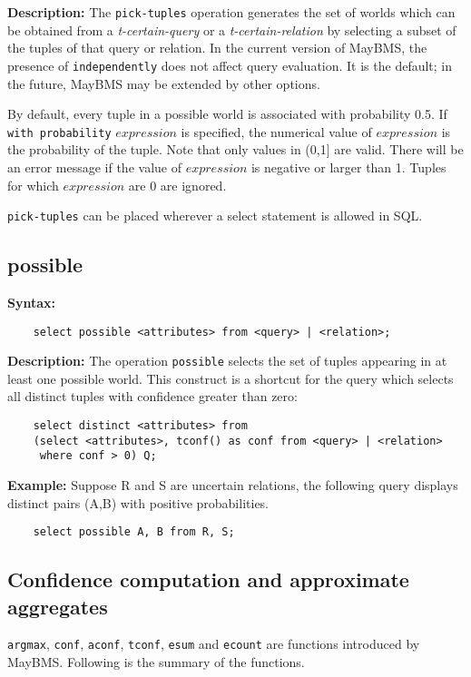 \noindent \textbf{Description:}
%
The {\tt pick-tuples} operation generates the set of worlds which can be obtained from a {\it t-certain-query} or a {\it t-certain-relation} by selecting a subset of the tuples of that query or relation. In the current version of MayBMS, the presence of {\tt independently} does not affect query evaluation. It is the default; in the future, MayBMS may be extended by other options.

By default, every tuple in a possible world is associated with probability 0.5. If {\tt with probability} $expression$ is specified, the numerical value of $expression$ is the probability of the tuple. Note that only values in (0,1] are valid. There will be an error message if the value of $expression$ is negative or larger than 1. Tuples for which $expression$ are 0 are ignored. 

{\tt pick-tuples} can be placed wherever a select statement is allowed in SQL. 

\subsection{possible}
\noindent \textbf{Syntax:}
\begin{verbatim}
    select possible <attributes> from <query> | <relation>;
\end{verbatim}

\noindent \textbf{Description:}
The operation {\tt possible} selects the set of tuples appearing in at least one possible world. This construct is a shortcut for the query which selects all distinct tuples with confidence greater than zero:
\begin{verbatim}
    select distinct <attributes> from
    (select <attributes>, tconf() as conf from <query> | <relation>
     where conf > 0) Q;
\end{verbatim}


\noindent \textbf{Example:}
Suppose R and S are uncertain relations, the following query displays distinct pairs (A,B) with positive probabilities.  
\begin{verbatim}
	select possible A, B from R, S; 
\end{verbatim}


\subsection{Confidence computation and approximate aggregates}

{\tt argmax}, {\tt conf}, {\tt aconf}, {\tt tconf}, {\tt esum} and {\tt ecount} are functions introduced by MayBMS. Following is the summary of the functions. \\

